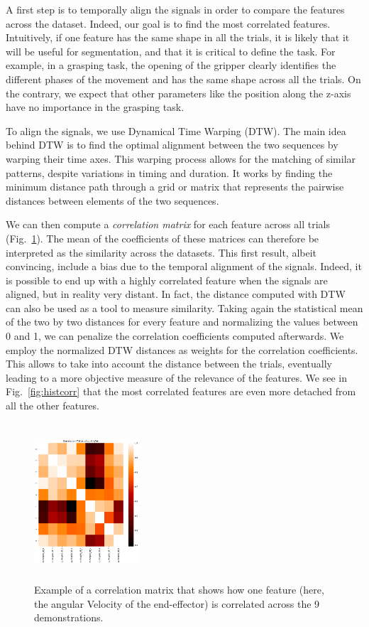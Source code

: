 \documentclass[conference]{IEEEtran}
\begin{document}
A first step is to temporally align the signals in order to compare the features across the dataset. Indeed, our goal is to find the most correlated features. Intuitively, if one feature has the same shape in all the trials, it is likely that it will be useful for segmentation, and that it is critical to define the task. For example, in a grasping task, the opening of the gripper clearly identifies the different phases of the movement and has the same shape across all the trials. On the contrary, we expect that other parameters like the position along the z-axis have no importance in the grasping task.

To align the signals, we use Dynamical Time Warping (DTW). The main idea behind DTW is to find the optimal alignment between the two sequences by warping their time axes. This warping process allows for the matching of similar patterns, despite variations in timing and duration. It works by finding the minimum distance path through a grid or matrix that represents the pairwise distances between elements of the two sequences. \newline


We can then compute a \textit{correlation matrix} for each feature across all trials (Fig.~\ref{fig:corrMat}). The mean of the coefficients of these matrices can therefore be interpreted as the similarity across the datasets. This first result, albeit convincing, include a bias due to the temporal alignment of the signals. Indeed, it is possible to end up with a highly correlated feature when the signals are aligned, but in reality very distant. In fact, the distance computed with DTW can also be used as a tool to measure similarity. Taking again the statistical mean of the two by two distances for every feature and normalizing the values between 0 and 1, we can penalize the correlation coefficients computed afterwards. We employ the normalized DTW distances as weights for the correlation coefficients. This allows to take into account the distance between the trials, eventually leading to a more objective measure of the relevance of the features. We see in Fig.~\ref{fig:histcorr} that the most correlated features are even more detached from all the other features.  

\begin{figure}[t]
  \centering
  \includegraphics[width=0.35\textwidth, height = 2.3in]{img/resolCorrMap.png}
  \caption{Example of a correlation matrix that shows how one feature (here, the angular Velocity of the end-effector) is correlated across the 9 demonstrations.}
  \label{fig:corrMat}
\end{figure}
\end{document}
